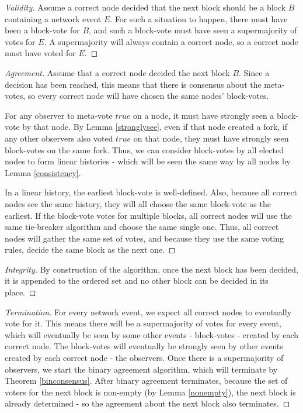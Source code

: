 \documentclass[a4paper,fleqn]{article}
\begin{document}
\begin{proof}[Validity]
	Assume a correct node decided that the next block should be a block $B$ containing a network
	event $E$. For such a situation to happen, there must have been a block-vote for $B$, and such
	a block-vote must have seen a supermajority of votes for $E$. A supermajority will always
	contain a correct node, so a correct node must have voted for $E$.
\end{proof}

\begin{proof}[Agreement]
	Assume that a correct node decided the next block $B$. Since a decision has been reached, this
	means that there is consensus about the meta-votes, so every correct node will have chosen the
	same nodes' block-votes. 

	For any observer to meta-vote $true$ on a node, it must have strongly seen a block-vote by that
	node. By Lemma \ref{stronglysee}, even if that node created a fork, if any other observers also
	voted $true$ on that node, they must have strongly seen block-votes on the same fork. Thus, we
	can consider block-votes by all elected nodes to form linear histories - which will be seen the
	same way by all nodes by Lemma \ref{consistency}.

	In a linear history, the earliest block-vote is well-defined. Also, because all correct nodes
	see the same history, they will all choose the same block-vote as the earliest. If the
	block-vote votes for multiple blocks, all correct nodes will use the same tie-breaker algorithm
	and choose the same single one. Thus, all correct nodes will gather the same set of votes, and
	because they use the same voting rules, decide the same block as the next one.
\end{proof}

\begin{proof}[Integrity]
	By construction of the algorithm, once the next block has been decided, it is appended to the
	ordered set and no other block can be decided in its place.
\end{proof}

\begin{proof}[Termination]
	For every network event, we expect all correct nodes to eventually vote for it. This means
	there will be a supermajority of votes for every event, which will eventually be seen by some
	other events - block-votes - created by each correct node. The block-votes will eventually be
	strongly seen by other events created by each correct node - the observers. Once there is a
	supermajority of observers, we start the binary agreement algorithm, which will terminate
	by Theorem \ref{binconsensus}. After binary agreement terminates, because the set of voters for
	the next block is non-empty (by Lemma \ref{nonempty}), the next block is already determined -
	so the agreement about the next block also terminates.
\end{proof}
\end{document}
